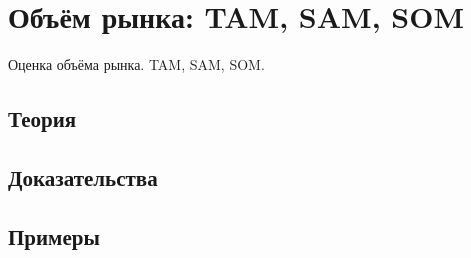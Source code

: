 
\section{Объём рынка: TAM, SAM, SOM}
\label{sec:2.6.02-market-sizing}

\begin{ticket}
Оценка объёма рынка. TAM, SAM, SOM.
\end{ticket}

\subsection*{Теория}

\subsection*{Доказательства}

\subsection*{Примеры}
